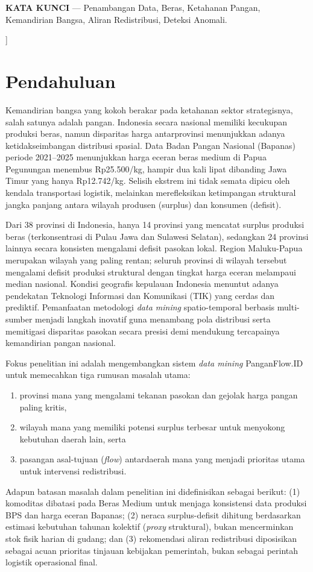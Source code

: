 \documentclass[journal, a4paper]{IEEEtran}
\begin{document}
\begin{@twocolumnfalse}
    \vspace{0.8em}
    \noindent\textbf{\sffamily KATA KUNCI} --- Penambangan Data, Beras, Ketahanan Pangan, Kemandirian Bangsa, Aliran Redistribusi, Deteksi Anomali.
    \vspace{2.0em}
  \end{@twocolumnfalse}
]


\section{Pendahuluan}
Kemandirian bangsa yang kokoh berakar pada ketahanan sektor strategisnya, salah satunya adalah pangan. Indonesia secara nasional memiliki kecukupan produksi beras, namun disparitas harga antarprovinsi menunjukkan adanya ketidakseimbangan distribusi spasial. Data Badan Pangan Nasional (Bapanas) periode 2021--2025 menunjukkan harga eceran beras medium di Papua Pegunungan menembus Rp25.500/kg, hampir dua kali lipat dibanding Jawa Timur yang hanya Rp12.742/kg. Selisih ekstrem ini tidak semata dipicu oleh kendala transportasi logistik, melainkan merefleksikan ketimpangan struktural jangka panjang antara wilayah produsen (surplus) dan konsumen (defisit).

Dari 38 provinsi di Indonesia, hanya 14 provinsi yang mencatat surplus produksi beras (terkonsentrasi di Pulau Jawa dan Sulawesi Selatan), sedangkan 24 provinsi lainnya secara konsisten mengalami defisit pasokan lokal. Region Maluku-Papua merupakan wilayah yang paling rentan; seluruh provinsi di wilayah tersebut mengalami defisit produksi struktural dengan tingkat harga eceran melampaui median nasional. Kondisi geografis kepulauan Indonesia menuntut adanya pendekatan Teknologi Informasi dan Komunikasi (TIK) yang cerdas dan prediktif. Pemanfaatan metodologi \textit{data mining} spatio-temporal berbasis multi-sumber menjadi langkah inovatif guna menambang pola distribusi serta memitigasi disparitas pasokan secara presisi demi mendukung tercapainya kemandirian pangan nasional.

Fokus penelitian ini adalah mengembangkan sistem \textit{data mining} PanganFlow.ID untuk memecahkan tiga rumusan masalah utama:
\begin{enumerate}
    \item provinsi mana yang mengalami tekanan pasokan dan gejolak harga pangan paling kritis,
    \item wilayah mana yang memiliki potensi surplus terbesar untuk menyokong kebutuhan daerah lain, serta
    \item pasangan asal-tujuan (\textit{flow}) antardaerah mana yang menjadi prioritas utama untuk intervensi redistribusi.
\end{enumerate}
Adapun batasan masalah dalam penelitian ini didefinisikan sebagai berikut: (1) komoditas dibatasi pada Beras Medium untuk menjaga konsistensi data produksi BPS dan harga eceran Bapanas; (2) neraca surplus-defisit dihitung berdasarkan estimasi kebutuhan tahunan kolektif (\textit{proxy} struktural), bukan mencerminkan stok fisik harian di gudang; dan (3) rekomendasi aliran redistribusi diposisikan sebagai acuan prioritas tinjauan kebijakan pemerintah, bukan sebagai perintah logistik operasional final.
\end{document}
